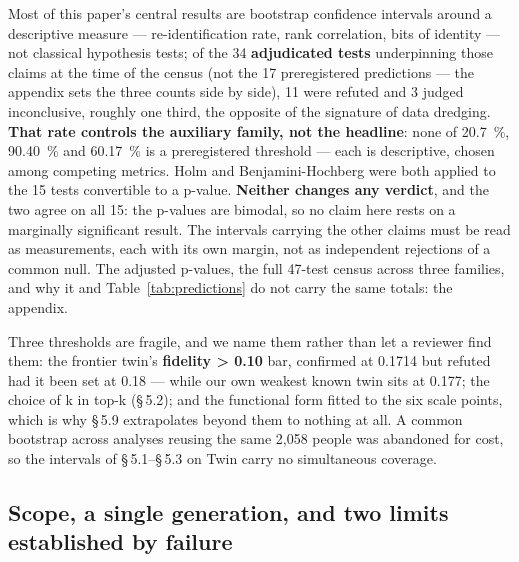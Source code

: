 \documentclass[sigconf,anonymous,review]{acmart}
\begin{document}
Most of this paper's central results are bootstrap confidence intervals around a descriptive measure --- re-identification rate, rank correlation, bits of identity --- not classical hypothesis tests; of the 34 \textbf{adjudicated tests} underpinning those claims at the time of the census (not the 17 preregistered predictions --- the appendix sets the three counts side by side), 11 were refuted and 3 judged inconclusive, roughly one third, the opposite of the signature of data dredging. \textbf{That rate controls the auxiliary family, not the headline}: none of 20.7~\%, 90.40~\% and 60.17~\% is a preregistered threshold --- each is descriptive, chosen among competing metrics. Holm and Benjamini-Hochberg were both applied to the 15 tests convertible to a p-value. \textbf{Neither changes any verdict}, and the two agree on all 15: the p-values are bimodal, so no claim here rests on a marginally significant result. The intervals carrying the other claims must be read as measurements, each with its own margin, not as independent rejections of a common null. The adjusted p-values, the full 47-test census across three families, and why it and Table~\ref{tab:predictions} do not carry the same totals: the appendix.

Three thresholds are fragile, and we name them rather than let a reviewer find them: the frontier twin's \textbf{fidelity > 0.10} bar, confirmed at 0.1714 but refuted had it been set at 0.18 --- while our own weakest known twin sits at 0.177; the choice of k in top-k (\S\,5.2); and the functional form fitted to the six scale points, which is why \S\,5.9 extrapolates beyond them to nothing at all. A common bootstrap across analyses reusing the same 2,058 people was abandoned for cost, so the intervals of \S\,5.1--\S\,5.3 on Twin carry no simultaneous coverage.

\subsection{Scope, a single generation, and two limits established by failure}
\end{document}

